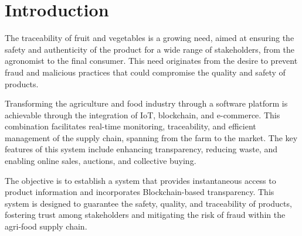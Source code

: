 \chapter*{Introduction}

The traceability of fruit and vegetables is a growing need, aimed at ensuring the safety and authenticity of the product for a wide range of stakeholders, from the agronomist to the final consumer. This need originates from the desire to prevent fraud and malicious practices that could compromise the quality and safety of products.

Transforming the agriculture and food industry through a software platform is achievable through the integration of IoT, blockchain, and e-commerce. This combination facilitates real-time monitoring, traceability, and efficient management of the supply chain, spanning from the farm to the market. The key features of this system include enhancing transparency, reducing waste, and enabling online sales, auctions, and collective buying.

The objective is to establish a system that provides instantaneous access to product information and incorporates Blockchain-based transparency. This system is designed to guarantee the safety, quality, and traceability of products, fostering trust among stakeholders and mitigating the risk of fraud within the agri-food supply chain.
